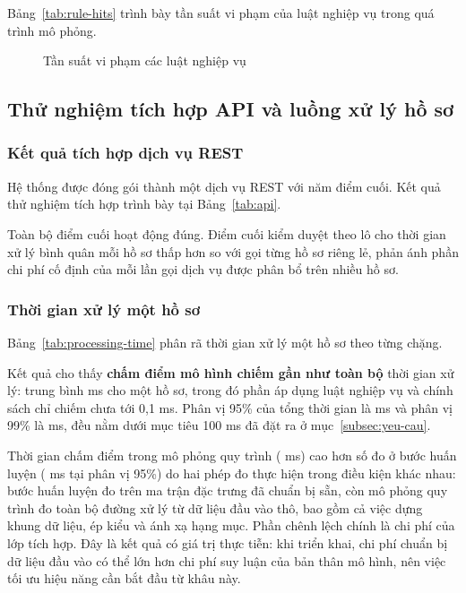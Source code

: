 Bảng~\ref{tab:rule-hits} trình bày tần suất vi phạm của \NRules{} luật nghiệp vụ
trong quá trình mô phỏng.



\begin{figure}[!htbp]
\centering
{}
\caption{Tần suất vi phạm các luật nghiệp vụ}
\label{fig:rule-hits}
\end{figure}

\subsection{Thử nghiệm tích hợp API và luồng xử lý hồ sơ}
\label{subsec:kq-api}

\subsubsection{Kết quả tích hợp dịch vụ REST}

Hệ thống được đóng gói thành một dịch vụ REST với năm điểm cuối. Kết quả thử
nghiệm tích hợp trình bày tại Bảng~\ref{tab:api}.



Toàn bộ điểm cuối hoạt động đúng. Điểm cuối kiểm duyệt theo lô cho thời gian xử
lý bình quân mỗi hồ sơ thấp hơn so với gọi từng hồ sơ riêng lẻ, phản ánh phần chi
phí cố định của mỗi lần gọi dịch vụ được phân bổ trên nhiều hồ sơ.

\subsubsection{Thời gian xử lý một hồ sơ}

Bảng~\ref{tab:processing-time} phân rã thời gian xử lý một hồ sơ theo từng chặng.



Kết quả cho thấy \textbf{chấm điểm mô hình chiếm gần như toàn bộ} thời gian xử
lý: trung bình \SysMean{} ms cho một hồ sơ, trong đó phần áp dụng luật nghiệp vụ
và chính sách chỉ chiếm chưa tới 0,1 ms. Phân vị 95\% của tổng thời gian là
\SysPNinetyFive{} ms và phân vị 99\% là \SysPNinetyNine{} ms, đều nằm dưới mục
tiêu 100 ms đã đặt ra ở mục~\ref{subsec:yeu-cau}.

Thời gian chấm điểm trong mô phỏng quy trình (\SysMean{} ms) cao hơn số đo ở bước
huấn luyện (\BestLatPFive{} ms tại phân vị 95\%) do hai phép đo thực hiện trong
điều kiện khác nhau: bước huấn luyện đo trên ma trận đặc trưng đã chuẩn bị sẵn,
còn mô phỏng quy trình đo toàn bộ đường xử lý từ dữ liệu đầu vào thô, bao gồm cả
việc dựng khung dữ liệu, ép kiểu và ánh xạ hạng mục. Phần chênh lệch chính là chi
phí của lớp tích hợp. Đây là kết quả có giá trị thực tiễn: khi triển khai, chi
phí chuẩn bị dữ liệu đầu vào có thể lớn hơn chi phí suy luận của bản thân mô
hình, nên việc tối ưu hiệu năng cần bắt đầu từ khâu này.

